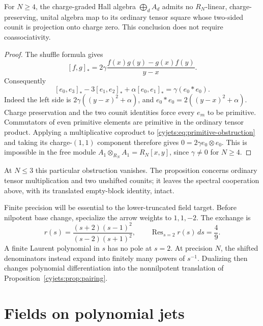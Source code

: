\begin{proposition}\label{cyjets:prop:no-ordinary-coproduct}
For $N\geq4$, the charge-graded Hall algebra $\bigoplus_dA_d$
admits no $R_N$-linear, charge-preserving, unital algebra map to
its ordinary tensor square whose two-sided counit is projection
onto charge zero. This conclusion does not require coassociativity.
\end{proposition}
\begin{proof}
The shuffle formula gives
\[
 [f,g]_* =2\gamma\frac{f(x)g(y)-g(x)f(y)}{y-x}.
\]
Consequently
\begin{equation}\label{cyjets:eq:primitive-obstruction}
 [e_0,e_3]_* -3[e_1,e_2]_*+\alpha[e_0,e_1]_*
       =\gamma(e_0*e_0).
\end{equation}
Indeed the left side is
$2\gamma((y-x)^2+\alpha)$, and
$e_0*e_0=2((y-x)^2+\alpha)$.
Charge preservation and the two counit identities force every
$e_m$ to be primitive. Commutators of even primitive elements
are primitive in the ordinary tensor product. Applying a
multiplicative coproduct to \eqref{cyjets:eq:primitive-obstruction}
and taking its charge-$(1,1)$ component therefore gives
$0=2\gamma e_0\otimes e_0$. This is impossible in the free
module $A_1\otimes_{R_N}A_1=R_N[x,y]$, since $\gamma\ne0$
for $N\geq4$.
\end{proof}

At $N\leq3$ this particular obstruction vanishes. The proposition
concerns ordinary tensor multiplication and two unshifted counits;
it leaves the spectral cooperation above, with its translated
empty-block identity, intact.

Finite precision will be essential to the lower-truncated field target.
Before nilpotent base change, specialize the arrow weights to $1,1,-2$.
The exchange is
\[
 r(s)=\frac{(s+2)(s-1)^2}{(s-2)(s+1)^2},\qquad
 \operatorname{Res}_{s=2}r(s)\,ds=\frac49.
\]
A finite Laurent polynomial in $s$ has no pole at $s=2$. At precision
$N$, the shifted denominators instead expand into finitely many
powers of $s^{-1}$. Dualizing then changes polynomial differentiation
into the nonnilpotent translation of
Proposition~\ref{cyjets:prop:pairing}.

\section{Fields on polynomial jets}
\label{cyjets:sec:fields}

